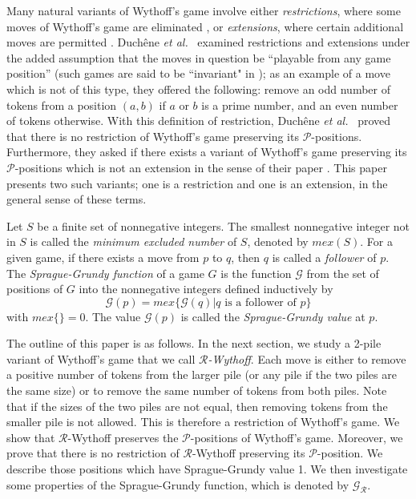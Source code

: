 \documentclass[12pt]{amsart}
\theoremstyle{plain}
\theoremstyle{definition}
\theoremstyle{remark}
\begin{document}
Many natural variants of Wythoff's game involve either {\em restrictions}, where some moves of Wythoff's game are eliminated \cite{Gen-Connell, Nim-Wythoff, Ho}, or {\em extensions}, where certain additional moves are permitted \cite{Heapgame, Howtobeat, Gen-Fra, Adjoining, Ho, hog, Some-Gen}. Duch\^{e}ne \emph{et al.}~\cite{Ext-Res} examined restrictions and extensions under the added assumption that the moves in question be ``playable from any game position'' (such games are said to be ``invariant" in \cite{inv}); as an example of a move which is not of this type, they offered the following: remove an odd number of tokens from a position $(a,b)$ if $a$ or $b$ is a prime number, and an even number of tokens otherwise. With this definition of restriction, Duch\^{e}ne \emph{et al.}~\cite{Ext-Res} proved that there is no restriction of Wythoff's game preserving its ${\mathcal{P}}$-positions. Furthermore, they asked if there exists a variant of Wythoff's game preserving its ${\mathcal{P}}$-positions  which is not an extension in the sense of their paper \cite[Question 1]{Ext-Res}.  This paper presents two such variants; one is a restriction and one is an extension, in the general sense of these terms.

Let $S$ be a finite set of nonnegative integers. The smallest nonnegative integer not in $S$ is called the \emph{minimum excluded number} of $S$, denoted by $mex(S)$. For a given game, if there exists a move from $p$ to $q$, then $q$ is called a \emph{follower} of $p$. The \emph{Sprague-Grundy function} of a game $G$ is the function $\mathcal{G}$ from the set of positions of $G$ into the nonnegative integers defined inductively by
\[\mathcal{G}(p) = mex\{\mathcal{G}(q)| q \text{ is a follower of } p\}\]
with $mex\{\} = 0$. The value $\mathcal{G}(p)$ is called the \emph{Sprague-Grundy value} at $p$.

The outline of this paper is as follows. In the next section, we study a 2-pile variant of Wythoff's game that we call \emph{${\mathcal{R}}$-Wythoff}. Each move is either to remove a positive number of tokens from the larger pile (or any pile if the two piles are the same size) or to remove the same number of tokens from both piles. Note that if the sizes of the two piles are not equal, then removing tokens from the smaller pile is not allowed. This is therefore a restriction of Wythoff's game. We show that ${\mathcal{R}}$-Wythoff preserves the ${\mathcal{P}}$-positions of Wythoff's game. Moreover, we prove that there is no restriction of ${\mathcal{R}}$-Wythoff preserving its ${\mathcal{P}}$-position. We describe those positions which have Sprague-Grundy value 1. We then investigate some properties of the Sprague-Grundy function, which is denoted by ${\mathcal{G}}_{\mathcal{R}}$.
\end{document}
